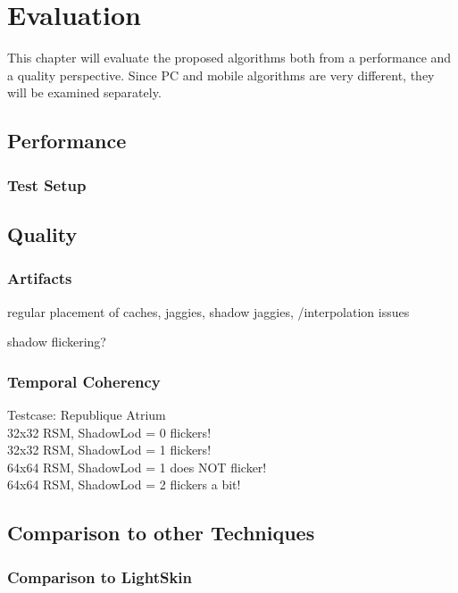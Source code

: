 \documentclass[thesis.tex]{subfiles}
\begin{document}
\chapter{Evaluation}
This chapter will evaluate the proposed algorithms both from a performance and a quality perspective. Since PC and mobile algorithms are very different, they will be examined separately.

\section{Performance}

\subsection{Test Setup}

\newpage

\section{Quality}

\subsection{Artifacts}

regular placement of caches, jaggies,
shadow jaggies,
/interpolation issues

shadow flickering?


\subsection{Temporal Coherency}

Testcase: Republique Atrium\\
32x32 RSM, ShadowLod = 0 flickers!\\
32x32 RSM, ShadowLod = 1 flickers!\\
64x64 RSM, ShadowLod = 1 does NOT flicker!\\
64x64 RSM, ShadowLod = 2 flickers a bit!


\section{Comparison to other Techniques}

\subsection{Comparison to LightSkin}

\subfilebib %
\end{document}
